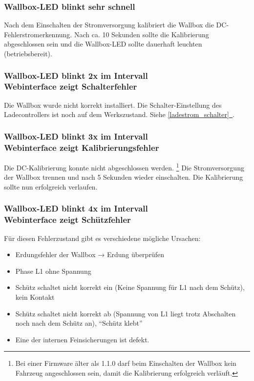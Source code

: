 \documentclass[a4paper,10pt]{article}
\newcommand*{\fullref}[1]{\hyperref[{#1}]{\ref*{#1}~\nameref*{#1}}}
\begin{document}
\begin{multicols*}{2}
	\subsubsection*{Wallbox-LED blinkt sehr schnell}
	Nach dem Einschalten der Stromversorgung kalibriert die Wallbox die
	DC-Fehlerstromerkennung. Nach ca. 10 Sekunden sollte die Kalibrierung
	abgeschlossen sein und die Wallbox-LED sollte dauerhaft leuchten
	(betriebsbereit).

	\subsubsection*{Wallbox-LED blinkt 2x im Intervall \\ Webinterface zeigt Schalterfehler}
	Die Wallbox wurde nicht korrekt installiert. Die Schalter-Einstellung des Ladecontrollers ist
	noch auf dem Werkszustand. Siehe \fullref{ladestrom_schalter}.

	\begin{minipage}{\linewidth} %
		\subsubsection*{Wallbox-LED blinkt 3x im Intervall \\ Webinterface zeigt Kalibrierungsfehler}
		Die DC-Kalibrierung konnte nicht abgeschlossen werden. \footnote{Bei einer Firmware älter
			als 1.1.0 darf beim Einschalten der Wallbox kein Fahrzeug angeschlossen sein, damit die
			Kalibrierung erfolgreich verläuft.} Die Stromversorgung der Wallbox
		trennen und nach 5 Sekunden wieder einschalten. Die Kalibrierung sollte nun
		erfolgreich verlaufen.
	\end{minipage}

	\subsubsection*{Wallbox-LED blinkt 4x im Intervall \\ Webinterface zeigt Schützfehler}
	Für diesen Fehlerzustand gibt es verschiedene mögliche Ursachen:
	\begin{itemize}
		\item Erdungsfehler der Wallbox → Erdung überprüfen
		\item Phase L1 ohne Spannung
		\item Schütz schaltet nicht korrekt ein (Keine Spannung für L1 nach dem Schütz), kein
		      Kontakt
		\item Schütz schaltet nicht korrekt ab (Spannung von L1 liegt trotz Abschalten noch
		      nach dem Schütz an), \enquote{Schütz klebt}
		\item Eine der internen Feinsicherungen ist defekt.
	\end{itemize}


\end{multicols*}
\end{document}

